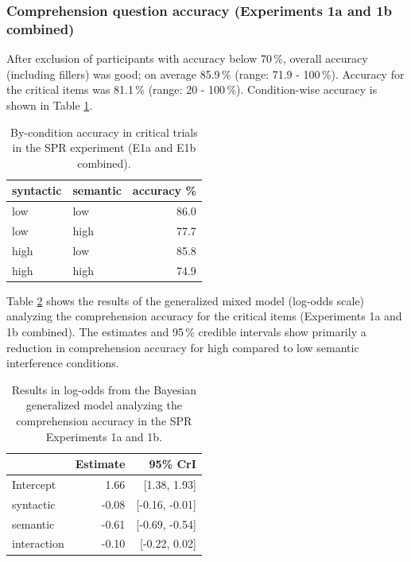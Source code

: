 \documentclass[a4paper, man, floatsintext]{apa7}
\begin{document}
\subsubsection{Comprehension question accuracy (Experiments 1a and 1b combined)}

After exclusion of participants with accuracy below 70\,\%, overall accuracy (including fillers) was good; on average 85.9\,\% (range: 71.9 - 100\,\%). Accuracy for the critical items was 81.1\,\% (range: 20 - 100\,\%). Condition-wise accuracy is shown in Table \ref{tab:spr_acc}.

\begin{table}[]
    \caption{By-condition accuracy in critical trials in the SPR experiment (E1a and E1b combined).}
    \label{tab:spr_acc}
    \centering
    \begin{tabular}{llr}
    \toprule
    syntactic & semantic & accuracy \%\\
    \midrule
        low &  low & 86.0\\
        low &  high & 77.7\\
        high &  low & 85.8\\
        high &  high & 74.9\\
    \bottomrule
    \end{tabular}
\end{table}

Table \ref{tab:spr_acc_mod} shows the results of the generalized mixed model (log-odds scale) analyzing the comprehension accuracy for the critical items (Experiments 1a and 1b combined). The estimates and 95\,\% credible intervals show primarily a reduction in comprehension accuracy for high compared to low semantic interference conditions.

\begin{table}[H]
    \caption{Results in log-odds from the Bayesian generalized model analyzing the comprehension accuracy in the SPR Experiments 1a and 1b.}
    \label{tab:spr_acc_mod}
    \centering
    \begin{tabular}{lrr}
    \toprule
    & Estimate &  95\% CrI  \\
    \midrule
Intercept& 1.66 &   [1.38, 1.93]\\
syntactic& -0.08 &  [-0.16, -0.01]\\
semantic&  -0.61 & [-0.69, -0.54]\\
interaction& -0.10&  [-0.22, 0.02]\\
    \bottomrule
    \end{tabular}
\end{table}
\end{document}
